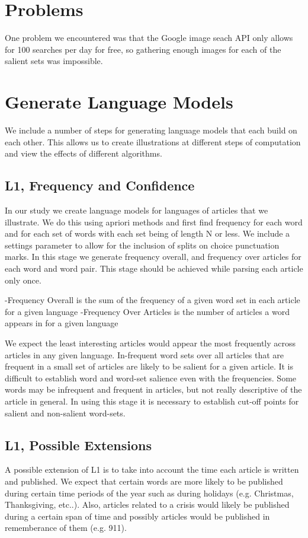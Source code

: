 \documentclass[12pt]{article}
\begin{document}
\section{Problems}
One problem we encountered was that the Google image seach API only allows for 100 searches per day for free, so gathering enough images for each of the salient sets was impossible.
\section{Generate Language Models}
We include a number of steps for generating language models that each build on each other. This allows us to create illustrations at different steps of computation and view the effects of different algorithms.
\subsection{L1, Frequency and Confidence}
In our study we create language models for languages of articles that we illustrate. We do this using apriori methods and first find frequency for each word and for each set of words with each set being of length N or less. We include a settings parameter to allow for the inclusion of splits on choice punctuation marks. In this stage we generate frequency overall, and frequency over articles for each word and word pair. This stage should be achieved while parsing each article only once.

-Frequency Overall is the sum of the frequency of a given word set in each article for a given language
-Frequency Over Articles is the number of articles a word appears in for a given language

We expect the least interesting articles would appear the most frequently across articles in any given language. In-frequent word sets over all articles that are frequent in a small set of articles are likely to be salient for a given article. It is difficult to establish word and word-set salience even with the frequencies. Some words may be infrequent and frequent in articles, but not really descriptive of the article in general. In using this stage it is necessary to establish
cut-off points for salient and non-salient word-sets.

\subsection{L1, Possible Extensions}
A possible extension of L1 is to take into account the time each article is written and published. We expect that certain words are more likely to be published during certain time periods of the year such as during holidays (e.g. Christmas, Thanksgiving, etc..). Also, articles related to a crisis would likely be published during a certain span of time and possibly articles would be published in rememberance of them (e.g. 911).
\end{document}
